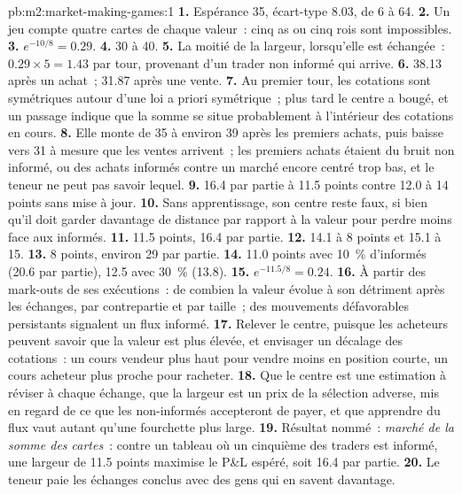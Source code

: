 \begin{solution}{pb:m2:market-making-games:1}
\textbf{1.} Espérance 35, écart-type 8.03, de 6 à 64.
\textbf{2.} Un jeu compte quatre cartes de chaque valeur~: cinq as ou cinq rois sont impossibles.
\textbf{3.} $e^{-10/8} = 0.29$.
\textbf{4.} 30 à 40.
\textbf{5.} La moitié de la largeur, lorsqu'elle est échangée~: $0.29 \times 5 = 1.43$ par tour, provenant
d'un trader non informé qui arrive.
\textbf{6.} 38.13 après un achat~; 31.87 après une vente.
\textbf{7.} Au premier tour, les cotations sont symétriques autour d'une loi a priori symétrique~; plus tard
le centre a bougé, et un passage indique que la somme se situe probablement à l'intérieur des cotations en cours.
\textbf{8.} Elle monte de 35 à environ 39 après les premiers achats, puis baisse vers 31 à mesure que les ventes
arrivent~; les premiers achats étaient du bruit non informé, ou des achats informés contre un marché encore
centré trop bas, et le teneur ne peut pas savoir lequel.
\textbf{9.} 16.4 par partie à 11.5 points contre 12.0 à 14 points sans mise à jour.
\textbf{10.} Sans apprentissage, son centre reste faux, si bien qu'il doit garder davantage de distance
par rapport à la valeur pour perdre moins face aux informés.
\textbf{11.} 11.5 points, 16.4 par partie.
\textbf{12.} 14.1 à 8 points et 15.1 à 15.
\textbf{13.} 8 points, environ 29 par partie.
\textbf{14.} 11.0 points avec 10~\% d'informés (20.6 par partie), 12.5 avec 30~\% (13.8).
\textbf{15.} $e^{-11.5/8} = 0.24$.
\textbf{16.} À partir des mark-outs de ses exécutions~: de combien la valeur évolue à son détriment après
les échanges, par contrepartie et par taille~; des mouvements défavorables persistants signalent un flux informé.
\textbf{17.} Relever le centre, puisque les acheteurs peuvent savoir que la valeur est plus élevée, et envisager
un décalage des cotations~: un cours vendeur plus haut pour vendre moins en position courte, un cours acheteur plus proche pour racheter.
\textbf{18.} Que le centre est une estimation à réviser à chaque échange, que la largeur est un
prix de la sélection adverse, mis en regard de ce que les non-informés accepteront de payer, et que
apprendre du flux vaut autant qu'une fourchette plus large.
\textbf{19.} Résultat nommé~: \emph{marché de la somme des cartes}~: contre un tableau où un cinquième des
traders est informé, une largeur de 11.5 points maximise le P\&L espéré, soit 16.4 par partie.
\textbf{20.} Le teneur paie les échanges conclus avec des gens qui en savent davantage.
\end{solution}

